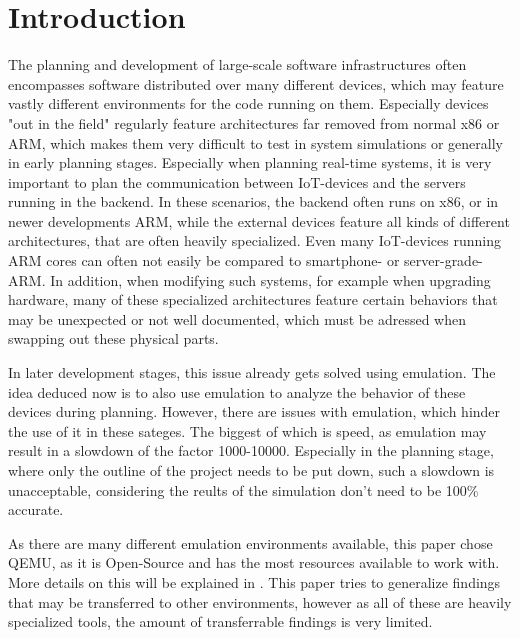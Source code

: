 
\chapter{Introduction}
The planning and development of large-scale software infrastructures often encompasses software distributed over many different devices,
which may feature vastly different environments for the code running on them.
Especially devices "out in the field" regularly feature architectures far removed from normal x86 or ARM,
which makes them very difficult to test in system simulations or generally in early planning stages.
Especially when planning real-time systems,
it is very important to plan the communication between IoT-devices and the servers running in the backend.
In these scenarios, the backend often runs on x86, or in newer developments ARM,
while the external devices feature all kinds of different architectures,
that are often heavily specialized.
Even many IoT-devices running ARM cores can often not easily be compared to smartphone-
or server-grade-ARM.
In addition, when modifying such systems, for example when upgrading hardware,
many of these specialized architectures feature certain behaviors that may be unexpected or not well documented,
which must be adressed when swapping out these physical parts.

In later development stages, this issue already gets solved using emulation.
The idea deduced now is to also use emulation to analyze the behavior of these devices during planning.
However, there are issues with emulation, which hinder the use of it in these sateges.
The biggest of which is speed, as emulation may result in a slowdown of the factor 1000-10000\cite{slowdown}.
Especially in the planning stage, where only the outline of the project needs to be put down,
such a slowdown is unacceptable, considering the reults of the simulation don't need to be 100\% accurate.

As there are many different emulation environments available,
this paper chose QEMU, as it is Open-Source and has the most resources available to work with.
More details on this will be explained in .
This paper tries to generalize findings that may be transferred to other environments,
however as all of these are heavily specialized tools,
the amount of transferrable findings is very limited.

